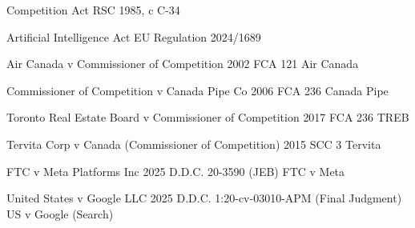 

  {Competition Act}
  {RSC 1985, c C-34}


  {Artificial Intelligence Act}
  {EU Regulation 2024/1689}


  {Air Canada v Commissioner of Competition}
  {2002 FCA 121}
  {Air Canada}

  {Commissioner of Competition v Canada Pipe Co}
  {2006 FCA 236}
  {Canada Pipe}

  {Toronto Real Estate Board v Commissioner of Competition}
  {2017 FCA 236}
  {TREB}

  {Tervita Corp v Canada (Commissioner of Competition)}
  {2015 SCC 3}
  {Tervita}


  {FTC v Meta Platforms Inc}
  {2025 D.D.C. 20-3590 (JEB)}
  {FTC v Meta}

  {United States v Google LLC}
  {2025 D.D.C. 1:20-cv-03010-APM (Final Judgment)}
  {US v Google (Search)}

